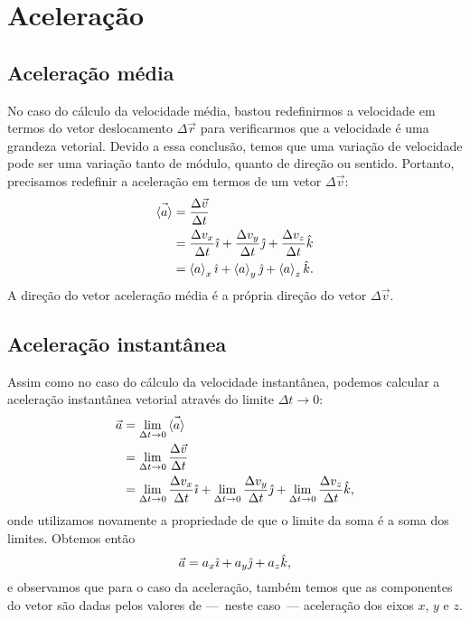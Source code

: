 \section{Aceleração}

\subsection{Aceleração média}

No caso do cálculo da velocidade média, bastou redefinirmos a velocidade em termos do vetor deslocamento $\Delta\vec{r}$ para verificarmos que a velocidade é uma grandeza vetorial. Devido a essa conclusão, temos que uma variação de velocidade pode ser uma variação tanto de módulo, quanto de direção ou sentido. Portanto, precisamos redefinir a aceleração em termos de um vetor $\Delta\vec{v}$:
\begin{align}
  \vec{\left\langle{a}\right\rangle} &= \frac{\Delta\vec{v}}{\Delta t} \\
  &= \frac{\Delta v_x}{\Delta t}\hat{\imath} + \frac{\Delta v_y}{\Delta t}\hat{\jmath} + \frac{\Delta v_z}{\Delta t}\hat{k} \\
  &= \left\langle{a}\right\rangle_x\hat{\imath} + \left\langle{a}\right\rangle_y\hat{\jmath} + \left\langle{a}\right\rangle_z\hat{k}.
\end{align} 
%
A direção do vetor aceleração média é a própria direção do vetor $\Delta{\vec{v}}$. 

\subsection{Aceleração instantânea}

Assim como no caso do cálculo da velocidade instantânea, podemos calcular a aceleração instantânea vetorial através do limite $\Delta t \to 0$:
\begin{align}
  \vec{a} &= \lim_{\Delta t \to 0} \vec{\left\langle{a}\right\rangle} \\
  &= \lim_{\Delta t \to 0} \frac{\Delta \vec{v}}{\Delta t} \\
  &= \lim_{\Delta t \to 0} \frac{\Delta {v_x}}{\Delta t}\hat{\imath} + \lim_{\Delta t \to 0} \frac{\Delta {v_y}}{\Delta t}\hat{\jmath} + \lim_{\Delta t \to 0} \frac{\Delta {v_z}}{\Delta t}\hat{k},
\end{align}
%
onde utilizamos novamente a propriedade de que o limite da soma é a soma dos limites. Obtemos então
\begin{equation}
  \vec{a} = a_x \hat{\imath} + a_y \hat{\jmath} + a_z \hat{k},
\end{equation}
%
e observamos que para o caso da aceleração, também temos que as componentes do vetor são dadas pelos valores de ---~neste caso~--- aceleração dos eixos $x$, $y$ e $z$.

